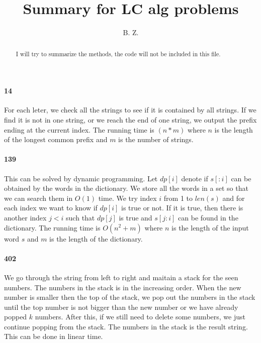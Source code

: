 \documentclass[11pt]{article}
\begin{document}
\title{
{Summary for LC alg problems}
}
\author{B. Z.}
\date{}
\maketitle
\begin{abstract}
I will try to summarize the methods, the code will not be included in this file.
\end{abstract}

\paragraph{14}
For each leter, we check all the strings to see if it is contained by all strings. If we find it is not in one string, or we  
reach the end of one string, we output the prefix ending at the current index. The running time is $(n*m)$ where $n$ is the 
length of the longest common prefix and $m$ is the number of strings.

\paragraph{139}
This can be solved by dynamic programming. Let $dp[i]$ denote if $s[:i]$ can be obtained by the words in the dictionary. We 
store all the words in a set so that we can search them in $O(1)$ time. We try index $i$ from 1 to $len(s)$ and for each index 
we want to know if $dp[i]$ is true or not. If it is true, then there is another index $j < i$ such that $dp[j]$ is true and 
$s[j:i]$ can be found in the dictionary. The running time is $O(n^2 + m)$ where $n$ is the length of the input word $s$ and 
$m$ is the length of the dictionary.

\paragraph{402}
We go through the string from left to right and maitain a stack for the seen numbers. The numbers in the stack is in the 
increasing order. When the new number is smaller then the top of the stack, we pop out the numbers in the stack until the top
number is not bigger than the new number or we have already popped $k$ numbers. After this, if we still need to delete some 
numbers, we just continue popping from the stack. The numbers in the stack is the result string. 
This can be done in linear time.
\end{document}
